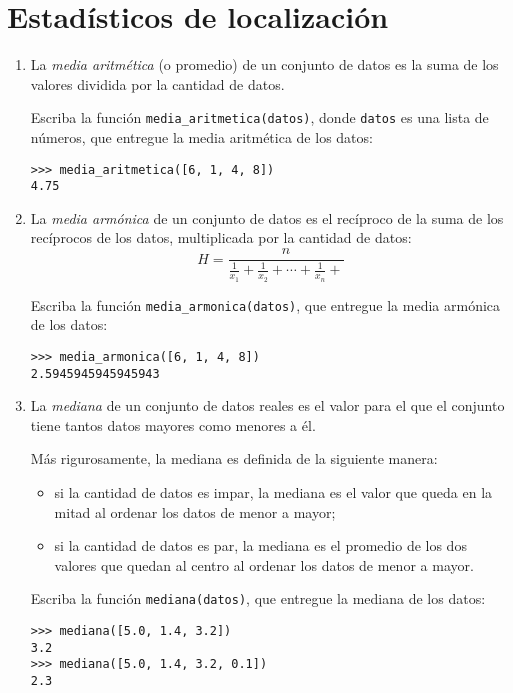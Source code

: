 \section{Estadísticos de localización}

\begin{enumerate}

  \item
    La \emph{media aritmética} (o promedio) de un conjunto de datos es la
    suma de los valores dividida por la cantidad de datos.

    Escriba la función \lstinline!media_aritmetica(datos)!, donde
    \lstinline!datos! es una lista de números, que entregue la media
    aritmética de los datos:

\begin{lstlisting}
>>> media_aritmetica([6, 1, 4, 8])
4.75
\end{lstlisting}

  \item

    La \emph{media armónica} de un conjunto de datos es el recíproco de la
    suma de los recíprocos de los datos, multiplicada por la cantidad de
    datos:
    \[H = \frac{n}{
    \frac{1}{x_1} +
    \frac{1}{x_2} +
    \cdots +
    \frac{1}{x_n} +
    }\]

    Escriba la función \lstinline!media_armonica(datos)!, que entregue la
    media armónica de los datos:
\begin{lstlisting}
>>> media_armonica([6, 1, 4, 8])
2.5945945945945943
\end{lstlisting}

  \item
    La \emph{mediana} de un conjunto de datos reales es el valor para el
    que el conjunto tiene tantos datos mayores como menores a él.

    Más rigurosamente, la mediana es definida de la siguiente manera:

    \begin{itemize}
    \item
      si la cantidad de datos es impar, la mediana es el valor que queda en
      la mitad al ordenar los datos de menor a mayor;
    \item
      si la cantidad de datos es par, la mediana es el promedio de los dos
      valores que quedan al centro al ordenar los datos de menor a mayor.
    \end{itemize}

    Escriba la función \lstinline!mediana(datos)!, que entregue la mediana
    de los datos:
\begin{lstlisting}
>>> mediana([5.0, 1.4, 3.2])
3.2
>>> mediana([5.0, 1.4, 3.2, 0.1])
2.3
\end{lstlisting}


\end{enumerate}
